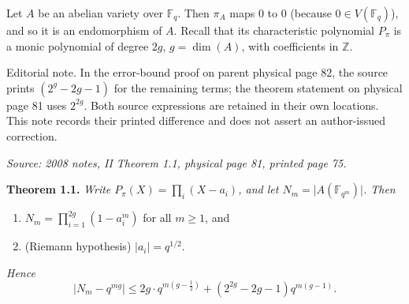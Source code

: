 \documentclass[11pt]{article}
\newcommand{\AVZ}{\mathbb{Z}}
\newcommand{\AVF}{\mathbb{F}}
\newcommand{\AVsrc}[1]{\par\smallskip\noindent\textit{Source: #1.}\par\smallskip}
\newcommand{\AVeditorial}[1]{\par\smallskip\noindent\textsf{Editorial note.} #1\par\smallskip}
\begin{document}
Let $A$ be an abelian variety over $\AVF_q$. Then $\pi_A$ maps $0$ to $0$
(because $0\in V(\AVF_q)$), and so it is an endomorphism of $A$.
Recall that its characteristic polynomial $P_\pi$ is a monic polynomial
of degree $2g$, $g=\dim(A)$, with coefficients in $\AVZ$.
\AVeditorial{In the error-bound proof on parent physical page 82, the source prints $(2^g-2g-1)$ for the remaining terms; the theorem statement on physical page 81 uses $2^{2g}$. Both source expressions are retained in their own locations. This note records their printed difference and does not assert an author-issued correction.}

\AVsrc{2008 notes, II Theorem 1.1, physical page 81, printed page 75}
\noindent\textbf{Theorem 1.1.}
\emph{Write $P_\pi(X)=\prod_i(X-a_i)$, and let
$N_m=\lvert A(\AVF_{q^m})\rvert$. Then}
\begin{enumerate}
\item[(a)] $\displaystyle N_m=\prod_{i=1}^{2g}(1-a_i^m)$ for all
  $m\geq1$, and
\item[(b)] (Riemann hypothesis) $\lvert a_i\rvert=q^{1/2}$.
\end{enumerate}
\emph{Hence}
\[
\lvert N_m-q^{mg}\rvert
\leq 2g\cdot q^{m(g-\frac12)}
+(2^{2g}-2g-1)q^{m(g-1)}.
\]
\end{document}
